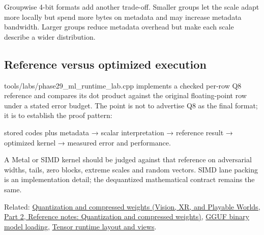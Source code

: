 Groupwise 4-bit formats add another trade-off. Smaller groups let the scale adapt more locally but spend more bytes on metadata and may increase metadata bandwidth. Larger groups reduce metadata overhead but make each scale describe a wider distribution.

\subsection{Reference versus optimized execution}\label{appendix-241c0e42ac2d-reference-versus-optimized-execution}

\hypertarget{appendix-241c0e42ac2d-reference-versus-optimized-execution}{}

tools/labs/phase29\_ml\_runtime\_lab.cpp implements a checked per-row Q8 reference and compares its dot product against the original floating-point row under a stated error budget. The point is not to advertise Q8 as the final format; it is to establish the proof pattern:

stored codes plus metadata → scalar interpretation → reference result → optimized kernel → measured error and performance.

A Metal or SIMD kernel should be judged against that reference on adversarial widths, tails, zero blocks, extreme scales and random vectors. SIMD lane packing is an implementation detail; the dequantized mathematical contract remains the same.

Related: \href{../07-Vision-XR-and-Playable-Worlds-P02/main.pdf\#nameddest=appendix-fdc7879e8bf2}{Quantization and compressed weights (Vision, XR, and Playable Worlds, Part 2, Reference notes: Quantization and compressed weights)}, \hyperref[appendix-fef72dd246f2]{GGUF binary model loading}, \hyperref[appendix-cebadf3106d1]{Tensor runtime layout and views}.

